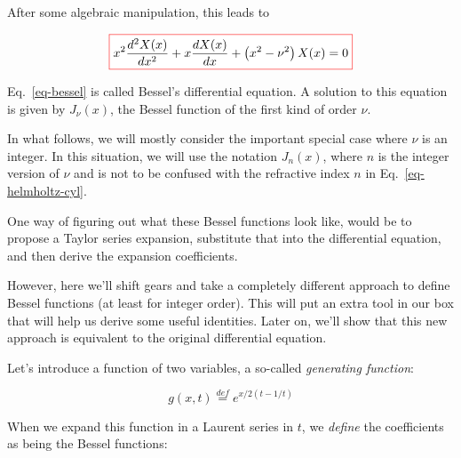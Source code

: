 After some algebraic manipulation, this leads to

\begin{equation}
\fbox{$\displaystyle
x^2\frac{d^2 X(x)}{d x^2} + x \frac{d X(x)}{d x} + \left(x ^ 2 - \nu^2 \right)X(x) = 0 \label{eq-bessel}
$}
\end{equation}

\noindent{}Eq.~\ref{eq-bessel} is called Bessel's differential equation. A solution to this equation is given by $J_\nu(x)$, the Bessel function of the first kind of order $\nu$.

In what follows, we will mostly consider the important special case where $\nu$ is an integer. In this situation, we will use the notation $J_n(x)$, where $n$ is the integer version of $\nu$ and is not to be confused with the refractive index $n$ in Eq.~\ref{eq-helmholtz-cyl}.


\pagebreak



One way of figuring out what these Bessel functions look like, would be to propose a Taylor series expansion, substitute that into the differential equation, and then derive the expansion coefficients.

However, here we'll shift gears and take a completely different approach to define Bessel functions (at least for integer order). This will put an extra tool in our box that will help us derive some useful identities. Later on, we'll show that this new approach is equivalent to the original differential equation.

\noindent{}Let's introduce a function of two variables, a so-called \emph{generating function}:

\begin{equation}
g(x,t) \stackrel{def}{=} e^{x/2(t-1/t)} \label{eq-gen-bessel}
\end{equation}


When we expand this function in a Laurent series in $t$, we \emph{define} the coefficients as being the Bessel functions:

